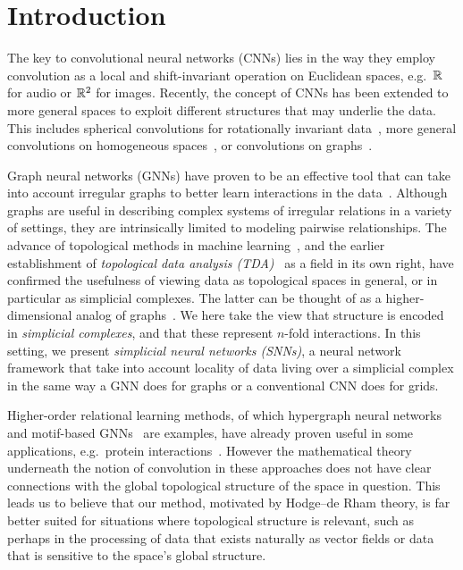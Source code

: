 \section{Introduction}

The key to convolutional neural networks (CNNs) lies in the way they employ convolution as a local and shift-invariant operation on Euclidean spaces, e.g.\ $\mathbb{R}$ for audio or $\mathbb{R}^2$ for images.
Recently, the concept of CNNs has been extended to more general spaces to exploit different structures that may underlie the data.
This includes spherical convolutions for rotationally invariant data~\cite{cohen2018sphericalcnn,esteves2018sphericalcnn,defferrard2020deepsphere}, more general convolutions on homogeneous spaces~\cite{cohen2016groupnn,kondor2018groupnn,worrall2017harmonicnn}, or convolutions on graphs~\cite{bruna2014graphnn,defferrard2016convolutional}.

Graph neural networks (GNNs) have proven to be an effective tool that can take into account irregular graphs to better learn interactions in the data~\cite{bronstein2017geometric,wu2020survey,battaglia2018relational}. Although graphs are useful in describing complex systems of irregular relations in a variety of settings, they are intrinsically limited to modeling pairwise relationships. The advance of topological methods in machine learning~\cite{Gabrielsson2020topological, Hofer2019LearningRO, rieck2018neural}, and the earlier establishment of \emph{topological data analysis (TDA)}~\cite{carlsson2008,chazal2017,edelsbrunner2010computational,ghrist2008barcodes} as a field in its own right, have confirmed the usefulness of viewing data as topological spaces in general, or in particular as simplicial complexes. The latter can be thought of as a higher-dimensional analog of graphs~\cite{moore2012,patania2017}. We here take the view that structure is encoded in \emph{simplicial complexes}, and that these represent $n$-fold interactions. In this setting, we present \emph{simplicial neural networks (SNNs)}, a neural network framework that take into account locality of data living over a simplicial complex in the same way a GNN does for graphs or a conventional CNN does for grids.

Higher-order relational learning methods, of which hypergraph neural networks~\cite{feng2018hypergraphs} and motif-based GNNs~\cite{monti2018motif} are examples, have already proven useful in some applications, e.g.\ protein interactions~\cite{ze2020graph}. However the mathematical theory underneath the notion of convolution in these approaches does not have clear connections with the global topological structure of the space in question. This leads us to believe that our method, motivated by Hodge--de Rham theory, is far better suited for situations where topological structure is relevant, such as perhaps in the processing of data that exists naturally as vector fields or data that is sensitive to the space's global structure.
